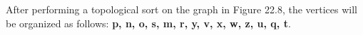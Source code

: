 After performing a topological sort on the graph in Figure 22.8, the vertices will be organized as follows: \textbf{p, n, o, s, m, r, y, v, x, w, z, u, q, t}.